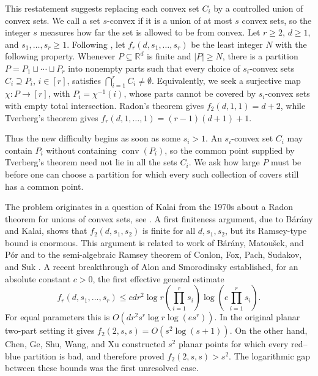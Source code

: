 \documentclass[11pt]{article}
\theoremstyle{definition}
\newcommand*{\abs}[1]{\lvert#1\rvert}
\newcommand{\R}{\mathbb{R}}
\newcommand{\conv}{\operatorname{conv}}
\begin{document}
This restatement suggests replacing each convex set \(C_{i}\) by a controlled union of convex sets. We call a set \(s\)-convex if it is a union of at most \(s\) convex sets, so the integer \(s\) measures how far the set is allowed to be from convex. Let \(r\ge2\), \(d\ge1\), and \(s_{1},\ldots,s_{r}\ge1\). Following \cite{AlonSmorodinsky2025}, let \(f_{r}(d,s_{1},\ldots,s_{r})\) be the least integer \(N\) with the following property. Whenever \(P\subseteq\R^{d}\) is finite and \(\abs{P}\ge N\), there is a partition \(P=P_{1}\sqcup\cdots\sqcup P_{r}\) into nonempty parts such that every choice of \(s_{i}\)-convex sets \(C_{i}\supseteq P_{i}\), \(i\in [r]\), satisfies \(\bigcap_{i=1}^{r}C_{i}\ne\emptyset\). Equivalently, we seek a surjective map \(\chi:P\to [r]\), with \(P_{i}=\chi^{-1}(i)\), whose parts cannot be covered by \(s_{i}\)-convex sets with empty total intersection. Radon's theorem gives \(f_{2}(d,1,1)=d+2\), while Tverberg's theorem gives \(f_{r}(d,1,\ldots,1)=(r-1)(d+1)+1\).

Thus the new difficulty begins as soon as some \(s_{i}>1\). An \(s_{i}\)-convex set \(C_{i}\) may contain \(P_{i}\) without containing \(\conv(P_{i})\), so the common point supplied by Tverberg's theorem need not lie in all the sets \(C_{i}\). We ask how large \(P\) must be before one can choose a partition for which every such collection of covers still has a common point.


The problem originates in a question of Kalai from the 1970s about a Radon theorem for unions of convex sets, see \cite{Kalai2017,2025KalaiBolg}. A first finiteness argument, due to B\'{a}r\'{a}ny and Kalai, shows that \(f_{2}(d,s_{1},s_{2})\) is finite for all \(d,s_{1},s_{2}\), but its Ramsey-type bound is enormous. This argument is related to work of B\'{a}r\'{a}ny, Matou\v{s}ek, and P\'{o}r \cite{BaranyMatousekPor2016} and to the semi-algebraic Ramsey theorem of Conlon, Fox, Pach, Sudakov, and Suk \cite{TRansAMS2014}. A recent breakthrough of Alon and Smorodinsky \cite{AlonSmorodinsky2025} established, for an absolute constant \(c>0\), the first effective general estimate
\[
f_{r}(d,s_{1},\ldots,s_{r})\le cdr^{2}\log r\left(\prod_{i=1}^{r}s_{i}\right)\log\left(e\prod_{i=1}^{r}s_{i}\right).
\]
For equal parameters this is \(O(dr^{2}s^{r}\log r\log(es^{r}))\). In the original planar two-part setting it gives \(f_{2}(2,s,s)=O(s^{2}\log(s+1))\). On the other hand, Chen, Ge, Shu, Wang, and Xu \cite{ChenGeShuWangXu2025} constructed \(s^{2}\) planar points for which every red--blue partition is bad, and therefore proved \(f_{2}(2,s,s)>s^{2}\). The logarithmic gap between these bounds was the first unresolved case.
\end{document}
